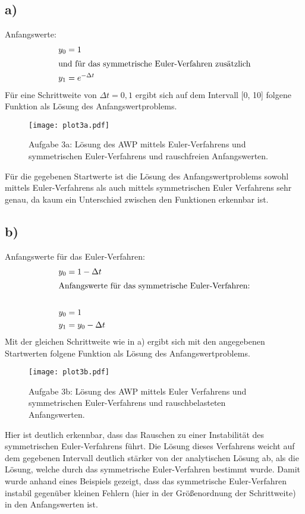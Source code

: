 \subsection*{a)}
Anfangswerte:
\begin{align*}
  y_0&=1\\
  \intertext{und für das symmetrische Euler-Verfahren zusätzlich}
  y_1&=e^{-\Delta t}
\end{align*}
Für eine Schrittweite von $\Delta t = 0,1$ ergibt sich auf dem Intervall [0, 10] folgene Funktion als Lösung des Anfangswertproblems.
\FloatBarrier
\begin{figure}[h]
    \centering
    \texttt{[image: plot3a.pdf]}
    \caption{Aufgabe 3a: Lösung des AWP mittels Euler-Verfahrens und symmetrischen Euler-Verfahrens und rauschfreien Anfangswerten.}
    \label{fig:plot3a}
\end{figure}
\FloatBarrier
Für die gegebenen Startwerte ist die Lösung des Anfangswertproblems sowohl mittels Euler-Verfahrens als auch mittels symmetrischen Euler Verfahrens sehr genau, da kaum ein Unterschied zwischen den Funktionen erkennbar ist.

\subsection*{b)}
Anfangswerte für das Euler-Verfahren:
\begin{align*}
  y_0&=1-\Delta t\\
  \intertext{Anfangswerte für das symmetrische Euler-Verfahren:}\\
  y_0&=1\\
  y_1&=y_0-\Delta t
\end{align*}
Mit der gleichen Schrittweite wie in a) ergibt sich mit den angegebenen Startwerten folgene Funktion als Lösung des Anfangswertproblems.
\FloatBarrier
\begin{figure}[h]
    \centering
    \texttt{[image: plot3b.pdf]}
    \caption{Aufgabe 3b: Lösung des AWP mittels Euler Verfahrens und symmetrischen Euler-Verfahrens und rauschbelasteten Anfangswerten.}
    \label{fig:plot3a}
\end{figure}
\FloatBarrier
Hier ist deutlich erkennbar, dass das Rauschen zu einer Instabilität des symmetrischen Euler-Verfahrens führt. Die Lösung dieses Verfahrens weicht auf dem gegebenen Intervall deutlich stärker von der analytischen Lösung ab, als die Lösung, welche durch das symmetrische Euler-Verfahren bestimmt wurde. Damit wurde anhand eines Beispiels gezeigt, dass das symmetrische Euler-Verfahren instabil gegenüber kleinen Fehlern (hier in der Größenordnung der Schrittweite) in den Anfangswerten ist.

